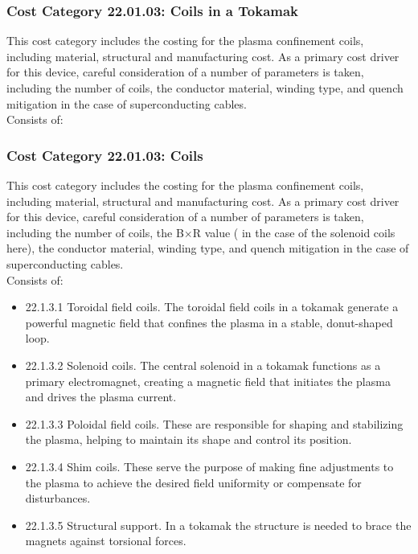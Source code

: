 
\subsubsection*{Cost Category 22.01.03: Coils in a Tokamak}

This cost category includes the costing for the plasma confinement coils, including  material, structural and manufacturing cost. As a primary cost driver for this device, careful consideration of a number of parameters is taken, including the number of coils, the conductor material, winding type, and quench mitigation in the case of superconducting cables.\\

Consists of:


   

\subsubsection*{Cost Category 22.01.03: Coils}

This cost category includes the costing for the plasma confinement coils, including  material, structural and manufacturing cost. As a primary cost driver for this device, careful consideration of a number of parameters is taken, including the number of coils, the B$\times$R value ( in the case of the solenoid coils here), the conductor material, winding type, and quench mitigation in the case of superconducting cables.\\

Consists of:

\begin{itemize}
    \item 22.1.3.1 Toroidal field coils. The toroidal field coils in a tokamak generate a powerful magnetic field that confines the plasma in a stable, donut-shaped loop.
    \item 22.1.3.2 Solenoid coils. The central solenoid in a tokamak functions as a primary electromagnet, creating a magnetic field that initiates the plasma and drives the plasma current.
    \item 22.1.3.3 Poloidal field coils. These are responsible for shaping and stabilizing the plasma, helping to maintain its shape and control its position.
    \item 22.1.3.4 Shim coils. These serve the purpose of making fine adjustments to the plasma to achieve the desired field uniformity or compensate for disturbances.
    \item 22.1.3.5 Structural support. In a tokamak the structure is needed to brace the magnets against torsional forces.
\end{itemize}
   

